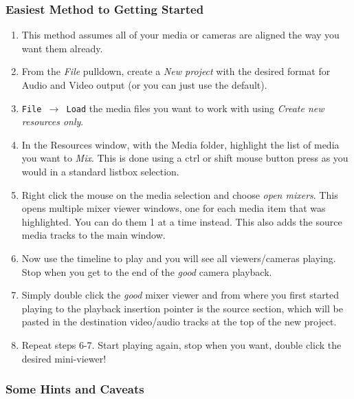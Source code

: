 \subsubsection*{Easiest Method to Getting Started}%
\label{ssub:easiest_method_started}

\begin{enumerate}
    \item This method assumes all of your media or cameras are aligned the way you want them already.
    \item From the \textit{File} pulldown, create a \textit{New project} with the desired format for Audio and Video output (or you can just use the default).
    \item \texttt{File $\rightarrow$ Load} the media files you want to work with using \textit{Create new resources only}.
    \item In the Resources window, with  the Media folder, highlight the list of media you want to \textit{Mix}. This is done using a ctrl or shift mouse button press as you would in a standard listbox selection.
    \item Right click the mouse on the media selection and choose \textit{open mixers}. This opens multiple mixer viewer windows, one for each media item that was highlighted.  You can
    do them 1 at a time instead.  This also adds the source media tracks to the main window.
    \item Now use the timeline to play and you will see all viewers/cameras playing.  Stop when you get to the
    end of the \textit{good} camera playback.
    \item Simply double click the \textit{good} mixer viewer and from where you first started playing to the playback insertion pointer is the source section, which will be pasted in the destination video/audio tracks at the top of the new project.
    \item Repeat steps 6-7.  Start playing again, stop when you want, double click the desired mini-viewer!
\end{enumerate}

\subsubsection*{Some Hints and Caveats}%
\label{ssub:hints_caveats}

